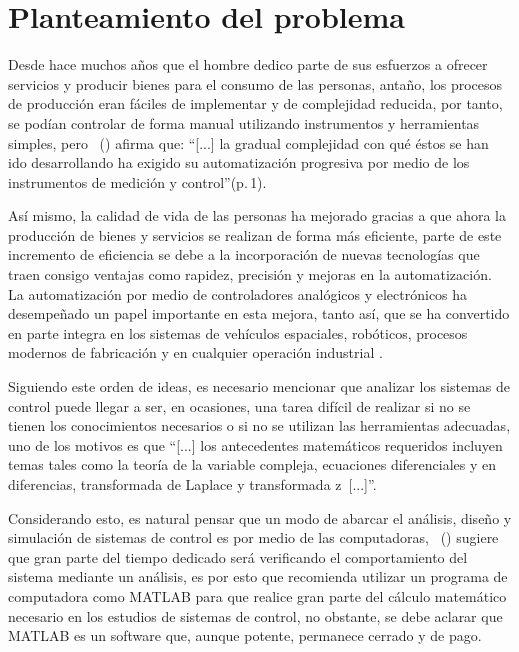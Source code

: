 \section{Planteamiento del problema}
	Desde hace muchos años que el hombre dedico parte de sus esfuerzos a ofrecer servicios y producir bienes para el consumo de las personas, antaño, los procesos de producción eran fáciles de implementar y de complejidad reducida, por tanto, se podían controlar de forma manual utilizando instrumentos y herramientas simples, pero \citeauthor{creus2010instrumentacion}~(\citeyear{creus2010instrumentacion}) afirma que: \enquote{[...] la gradual complejidad con qué éstos se han ido desarrollando ha exigido su automatización progresiva por medio de los instrumentos de medición y control}(p.$\,$1).
	
	Así mismo, la calidad de vida de las personas ha mejorado gracias a que ahora la producción de bienes y servicios se realizan de forma más eficiente, parte de este incremento de eficiencia se debe a la incorporación de nuevas tecnologías que traen consigo ventajas como rapidez, precisión y mejoras en la automatización. La automatización por medio de controladores analógicos y electrónicos ha desempeñado un papel importante en esta mejora, tanto así, que se ha convertido en parte integra en los sistemas de vehículos espaciales, robóticos, procesos modernos de fabricación y en cualquier operación industrial \Parencite{ogata2003ingenieria}.
		
	Siguiendo este orden de ideas, es necesario mencionar que analizar los sistemas de control puede llegar a ser, en ocasiones, una tarea difícil de realizar si no se tienen los conocimientos necesarios o si no se utilizan las herramientas adecuadas, uno de los motivos es que \enquote{[...] los antecedentes matemáticos requeridos incluyen temas tales como la teoría de la variable compleja, ecuaciones diferenciales y en diferencias, transformada de Laplace y transformada z~[...]}\parencite[p.$\,$21]{kuo1996sistemas}.
	
	Considerando esto, es natural pensar que un modo de abarcar el análisis, diseño y simulación de sistemas de control es por medio de las computadoras, \citeauthor{ogata2003ingenieria}~(\citeyear{ogata2003ingenieria}) sugiere que gran parte del tiempo dedicado será verificando el comportamiento del sistema mediante un análisis, es por esto que recomienda utilizar un programa de computadora como MATLAB para que realice gran parte del cálculo matemático necesario en los estudios de sistemas de control, no obstante, se debe aclarar que MATLAB es un software que, aunque potente, permanece cerrado y de pago.
	
